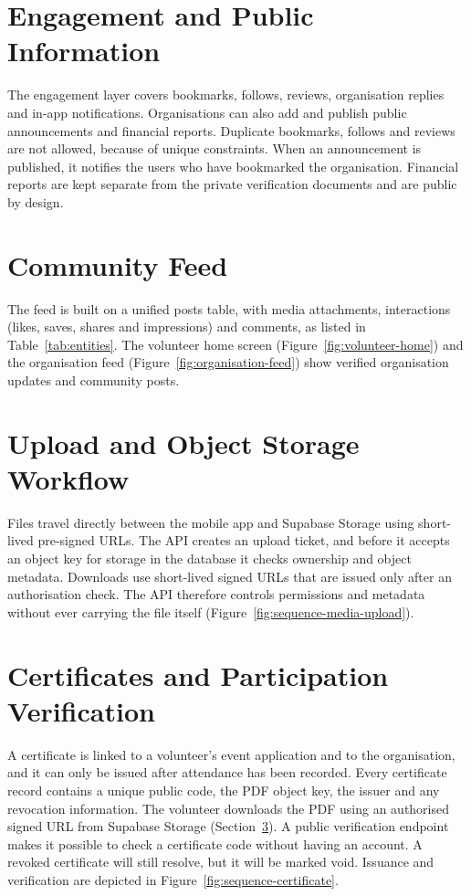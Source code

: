 \section{Engagement and Public Information}
\label{sec:impl-engagement}
The engagement layer covers bookmarks, follows, reviews, organisation replies and in-app notifications. Organisations can also add and publish public announcements and financial reports. Duplicate bookmarks, follows and reviews are not allowed, because of unique constraints. When an announcement is published, it notifies the users who have bookmarked the organisation. Financial reports are kept separate from the private verification documents and are public by design.

\section{Community Feed}
\label{sec:impl-feed}
The feed is built on a unified posts table, with media attachments, interactions (likes, saves, shares and impressions) and comments, as listed in Table~\ref{tab:entities}. The volunteer home screen (Figure~\ref{fig:volunteer-home}) and the organisation feed (Figure~\ref{fig:organisation-feed}) show verified organisation updates and community posts.

\section{Upload and Object Storage Workflow}
\label{sec:impl-uploads}
Files travel directly between the mobile app and Supabase Storage using short-lived pre-signed URLs. The API creates an upload ticket, and before it accepts an object key for storage in the database it checks ownership and object metadata. Downloads use short-lived signed URLs that are issued only after an authorisation check. The API therefore controls permissions and metadata without ever carrying the file itself (Figure~\ref{fig:sequence-media-upload}).


\section{Certificates and Participation Verification}
\label{sec:impl-certificates}
A certificate is linked to a volunteer's event application and to the organisation, and it can only be issued after attendance has been recorded. Every certificate record contains a unique public code, the PDF object key, the issuer and any revocation information. The volunteer downloads the PDF using an authorised signed URL from Supabase Storage (Section~\ref{sec:impl-uploads}). A public verification endpoint makes it possible to check a certificate code without having an account. A revoked certificate will still resolve, but it will be marked void. Issuance and verification are depicted in Figure~\ref{fig:sequence-certificate}.

